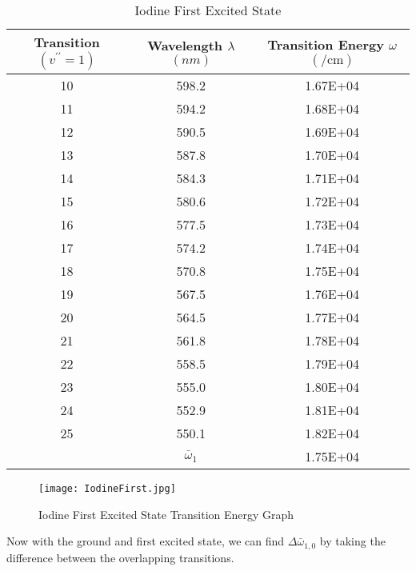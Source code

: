 \documentclass[12pt]{article}
\begin{document}
	\begin{table}[htbp]
		\centering
		\caption{Iodine First Excited State}
		\begin{tabular}{ccc}
			\toprule
			Transition $(v^{\prime\prime} = 1)$ & Wavelength $\lambda$ $(\unit{nm})$ & Transition Energy $\omega$ $(\unit{\per\centi\meter})$ \\
			\midrule
			10 & 598.2 & 1.67E+04 \\
			11 & 594.2 & 1.68E+04 \\
			12 & 590.5 & 1.69E+04 \\
			13 & 587.8 & 1.70E+04 \\
			14 & 584.3 & 1.71E+04 \\
			15 & 580.6 & 1.72E+04 \\
			16 & 577.5 & 1.73E+04 \\
			17 & 574.2 & 1.74E+04 \\
			18 & 570.8 & 1.75E+04 \\
			19 & 567.5 & 1.76E+04 \\
			20 & 564.5 & 1.77E+04 \\
			21 & 561.8 & 1.78E+04 \\
			22 & 558.5 & 1.79E+04 \\
			23 & 555.0 & 1.80E+04 \\
			24 & 552.9 & 1.81E+04 \\
			25 & 550.1 & 1.82E+04 \\
			\cmidrule{2-3}
			& $\bar{\omega}_1$ & 1.75E+04 \\
			\bottomrule
		\end{tabular}%
		\label{tab:IodineFirstExcitedState}%
	\end{table}%
	
	\begin{figure}[htbp]
		\centering
		\caption{Iodine First Excited State Transition Energy Graph}
		\label{IodineFirst}
		\texttt{[image: IodineFirst.jpg]}
	\end{figure}
	
	Now with the ground and first excited state, we can find $\Delta \bar{\omega}_{1,0}$ by taking the difference between the overlapping transitions.
	
\clearpage	
	
\end{document}
